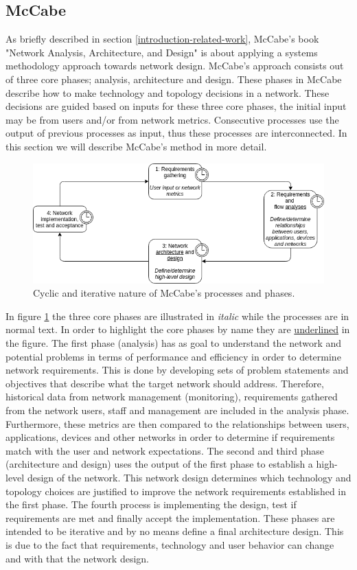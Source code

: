 \subsection{McCabe}
\label{overview-mccabe}
As briefly described in section \ref{introduction-related-work}, McCabe's book "Network Analysis, Architecture, and Design" \cite{mccabe2010network} is about applying a systems methodology approach towards network design. McCabe's approach consists out of three core phases; analysis, architecture and design. These phases in McCabe describe how to make technology and topology decisions in a network. These decisions are guided based on inputs for these three core phases, the initial input may be from users and/or from network metrics. Consecutive processes use the output of previous processes as input, thus these processes are interconnected. In this section we will describe McCabe's method in more detail.

\begin{figure}[H]
\centering
\includegraphics[width=\columnwidth]{Images/mccabe-process.png}
\caption{Cyclic and iterative nature of McCabe's processes and phases.}
\label{fig:mccabe-process}
\end{figure}

In figure \ref{fig:mccabe-process} the three core phases are illustrated in \textit{italic} while the processes are in normal text. In order to highlight the core phases by name they are \underline{underlined} in the figure. The first phase (analysis) has as goal to understand the network and potential problems in terms of performance and efficiency in order to determine network requirements. This is done by developing sets of problem statements and objectives that describe what the target network should address. Therefore, historical data from network management (monitoring), requirements gathered from the network users, staff and management are included in the analysis phase. Furthermore, these metrics are then compared to the relationships between users, applications, devices and other networks in order to determine if requirements match with the user and network expectations. The second and third phase (architecture and design) uses the output of the first phase to establish a high-level design of the network. This network design determines which technology and topology choices are justified to improve the network requirements established in the first phase. The fourth process is implementing the design, test if requirements are met and finally accept the implementation. These phases are intended to be iterative and by no means define a final architecture design. This is due to the fact that requirements, technology and user behavior can change and with that the network design.

